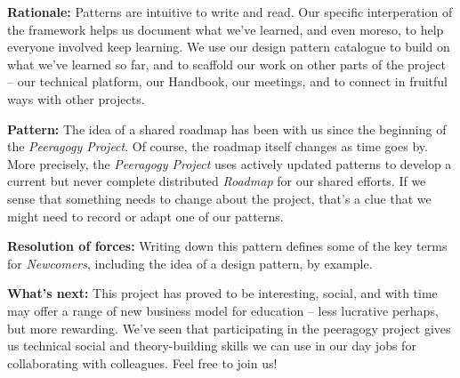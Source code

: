 \textbf{Rationale:}
Patterns are intuitive to write and read.  Our specific interperation of the framework helps us document what we've learned, and even moreso, to help everyone involved keep learning.  We use our design pattern catalogue to build on what we've learned so far, and to scaffold our work on other parts of the project -- our technical platform, our Handbook, our meetings, and to connect in fruitful ways with other projects.  

\textbf{Pattern:}
The idea of a shared roadmap has been with us since the beginning of the \emph{Peeragogy Project}.  Of course, the roadmap itself changes as time goes by.  More precisely, the \emph{Peeragogy Project} uses actively updated patterns to develop a current but never complete distributed \emph{Roadmap} for our shared efforts.  If we sense that something needs to  change about the project, that’s a clue that we might need to record or adapt one of our patterns.

\textbf{Resolution of forces:}  
Writing down this pattern defines some of the key terms for \emph{Newcomers}, including the idea of a design pattern, by example. 

\textbf{What's next:} 
This project has proved to be interesting, social, and with time may offer a range of new business model for education -- less lucrative perhaps, but more rewarding.  We've seen that participating in the peeragogy project gives us technical social and theory-building skills we can use in our day jobs for collaborating with colleagues.  Feel free to join us!